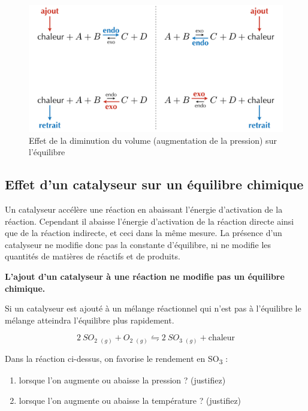 \documentclass[
  11pt,
  a4paper,
  openany]{book}
\providecommand{\tightlist}{%
  \setlength{\itemsep}{0pt}\setlength{\parskip}{0pt}}
\begin{document}
\begin{figure}

{\centering \includegraphics[width=0.75\linewidth]{images/equilibres-temperature-1} 

}

\caption{Effet de la diminution du volume (augmentation de la pression) sur l'équilibre}\label{fig:equilibres-temperature-1}
\end{figure}

\hypertarget{effet-dun-catalyseur-sur-un-uxe9quilibre-chimique}{%
\subsection{Effet d'un catalyseur sur un équilibre chimique}\label{effet-dun-catalyseur-sur-un-uxe9quilibre-chimique}}

Un catalyseur accélère une réaction en abaissant l'énergie d'activation de la réaction. Cependant il abaisse l'énergie d'activation de la réaction directe ainsi que de la réaction indirecte, et ceci dans la même mesure. La présence d'un catalyseur ne modifie donc pas la constante d'équilibre, ni ne modifie les quantités de matières de réactifs et de produits.

\textbf{L'ajout d'un catalyseur à une réaction ne modifie pas un équilibre chimique.}

Si un catalyseur est ajouté à un mélange réactionnel qui n'est pas à l'équilibre le mélange atteindra l'équilibre plus rapidement.

\begin{Exercise}

\[
  2\ SO_2\ _{(g)} + O_2\ _{(g)} \leftrightharpoons 2\ SO_3\ _{(g)} + \text{chaleur}
\]

Dans la réaction ci-dessus, on favorise le rendement en SO\textsubscript{3} :

\begin{enumerate}
\def\labelenumi{\alph{enumi}.}
\tightlist
\item
  lorsque l'on augmente ou abaisse la pression ? (justifiez)
\item
  lorsque l'on augmente ou abaisse la température ? (justifiez)
\end{enumerate}

\end{Exercise}
\end{document}
